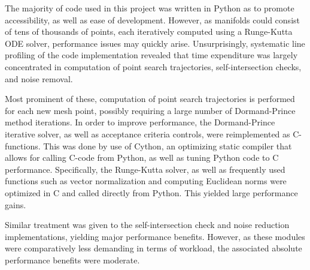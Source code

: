 The majority of code used in this project was written in Python as to promote accessibility, as well as ease of development. However, as manifolds could consist of tens of thousands of points, each iteratively computed using a Runge-Kutta ODE solver, performance issues may quickly arise. Unsurprisingly, systematic line profiling of the code implementation revealed that time expenditure was largely concentrated in computation of point search trajectories, self-intersection checks, and noise removal.

Most prominent of these, computation of point search trajectories is performed for each new mesh point, possibly requiring a large number of Dormand-Prince method iterations. In order to improve performance, the Dormand-Prince iterative solver, as well as acceptance criteria controls, were reimplemented as C-functions. This was done by use of Cython, an optimizing static compiler that allows for calling C-code from Python, as well as tuning Python code to C performance. Specifically, the Runge-Kutta solver, as well as frequently used functions such as vector normalization and computing Euclidean norms were optimized in C and called directly from Python. This yielded large performance gains.

Similar treatment was given to the self-intersection check and noise reduction implementations, yielding major performance benefits. However, as these modules were comparatively less demanding in terms of workload, the associated absolute performance benefits were moderate.

